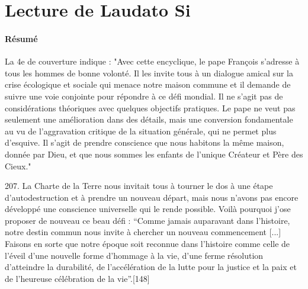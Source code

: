\section{Lecture de Laudato Si}



\paragraph{Résumé} \cite{francois_laudato_2015}
\begin{singlequote}
       La 4e de couverture indique : "Avec cette encyclique, le pape François s'adresse à tous les hommes de bonne volonté. Il les invite tous à un dialogue amical sur la crise écologique et sociale qui menace notre maison commune et il demande de suivre une voie conjointe pour répondre à ce défi mondial. Il ne s'agit pas de considérations théoriques avec quelques objectifs pratiques. Le pape ne veut pas seulement une amélioration dans des détails, mais une conversion fondamentale au vu de l'aggravation critique de la situation générale, qui ne permet plus d'esquive. Il s'agit de prendre conscience que nous habitons la même maison, donnée par Dieu, et que nous sommes les enfants de l'unique Créateur et Père des Cieux."
\end{singlequote}

\begin{singlequote}
        207. La Charte de la Terre nous invitait tous à tourner le dos à une étape d’autodestruction et à prendre un nouveau départ, mais nous n’avons pas encore développé une conscience universelle qui le rende possible. Voilà pourquoi j’ose proposer de nouveau ce beau défi : “Comme jamais auparavant dans l’histoire, notre destin commun nous invite à chercher un nouveau commencement [...] Faisons en sorte que notre époque soit reconnue dans l’histoire comme celle de l’éveil d’une nouvelle forme d’hommage à la vie, d’une ferme résolution d’atteindre la durabilité, de l’accélération de la lutte pour la justice et la paix et de l’heureuse célébration de la vie”.[148]
\end{singlequote}
       
